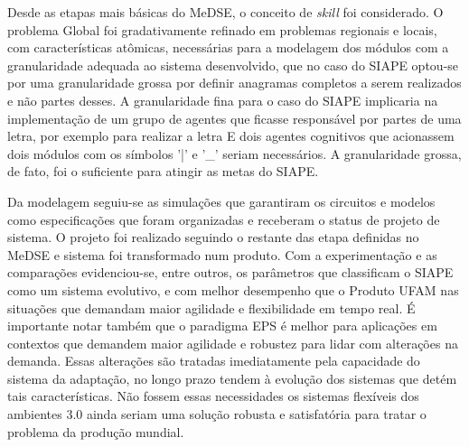 Desde as etapas mais básicas do MeDSE, o conceito de \textit{skill} foi considerado. O problema Global foi gradativamente refinado em problemas regionais e locais, com características atômicas, necessárias para a modelagem dos módulos com a granularidade adequada ao sistema desenvolvido, que no caso do SIAPE optou-se por uma granularidade grossa por definir anagramas completos a serem realizados e  não partes desses. A granularidade fina para o caso do SIAPE implicaria na implementação de um grupo de agentes que ficasse responsável por partes de uma letra, por exemplo para realizar a letra E dois agentes cognitivos que  acionassem dois módulos com os símbolos '|' e '\_'  seriam necessários. A granularidade grossa, de fato, foi o suficiente para atingir as metas do SIAPE.
 
Da modelagem seguiu-se as simulações que garantiram os circuitos e modelos como especificações que foram organizadas e receberam o status de projeto de sistema. O projeto foi realizado seguindo o restante das  etapa definidas no MeDSE e sistema foi transformado num produto. Com a experimentação e as comparações evidenciou-se, entre outros, os parâmetros que classificam o SIAPE como um sistema evolutivo, e com melhor desempenho que o Produto UFAM nas situações que demandam maior agilidade e flexibilidade em tempo real. É importante notar também que o paradigma EPS é melhor para aplicações em contextos que demandem maior agilidade e robustez para lidar com alterações na demanda. Essas alterações são tratadas imediatamente pela capacidade do sistema da adaptação, no longo prazo tendem à evolução dos sistemas que detém tais características. Não fossem essas necessidades os sistemas flexíveis dos ambientes 3.0 ainda seriam uma solução robusta e satisfatória para tratar o problema da produção mundial.   


   